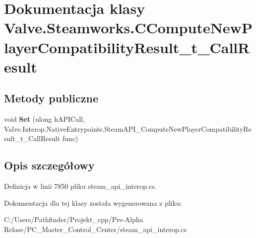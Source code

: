\hypertarget{class_valve_1_1_steamworks_1_1_c_compute_new_player_compatibility_result__t___call_result}{}\section{Dokumentacja klasy Valve.\+Steamworks.\+C\+Compute\+New\+Player\+Compatibility\+Result\+\_\+t\+\_\+\+Call\+Result}
\label{class_valve_1_1_steamworks_1_1_c_compute_new_player_compatibility_result__t___call_result}
\subsection*{Metody publiczne}
\begin{DoxyCompactItemize}
\item 
\mbox{\label{class_valve_1_1_steamworks_1_1_c_compute_new_player_compatibility_result__t___call_result_ac17c801409e9fe65ad05a998d192dbbf}} 
void {\bfseries Set} (ulong h\+A\+P\+I\+Call, Valve.\+Interop.\+Native\+Entrypoints.\+Steam\+A\+P\+I\+\_\+\+Compute\+New\+Player\+Compatibility\+Result\+\_\+t\+\_\+\+Call\+Result func)
\end{DoxyCompactItemize}


\subsection{Opis szczegółowy}


Definicja w linii 7850 pliku steam\+\_\+api\+\_\+interop.\+cs.



Dokumentacja dla tej klasy została wygenerowana z pliku\+:\begin{DoxyCompactItemize}
\item 
C\+:/\+Users/\+Pathfinder/\+Projekt\+\_\+cpp/\+Pre-\/\+Alpha Relase/\+P\+C\+\_\+\+Master\+\_\+\+Control\+\_\+\+Center/steam\+\_\+api\+\_\+interop.\+cs\end{DoxyCompactItemize}

